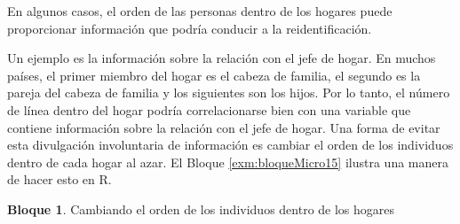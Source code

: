 \documentclass[]{book}
\newenvironment{Shaded}{\begin{snugshade}}{\end{snugshade}}
\newcommand{\CommentTok}[1]{\textcolor[rgb]{0.56,0.35,0.01}{\textit{#1}}}
\newcommand{\DecValTok}[1]{\textcolor[rgb]{0.00,0.00,0.81}{#1}}
\newcommand{\KeywordTok}[1]{\textcolor[rgb]{0.13,0.29,0.53}{\textbf{#1}}}
\newcommand{\NormalTok}[1]{#1}
\newcommand{\OperatorTok}[1]{\textcolor[rgb]{0.81,0.36,0.00}{\textbf{#1}}}
\newcommand{\StringTok}[1]{\textcolor[rgb]{0.31,0.60,0.02}{#1}}
\theoremstyle{definition}
\theoremstyle{definition}
\newtheorem{example}{Bloque}[chapter]
\theoremstyle{definition}
\theoremstyle{definition}
\theoremstyle{remark}
\begin{document}
\begin{Shaded}
\end{Shaded}

En algunos casos, el orden de las personas dentro de los hogares puede proporcionar información que podría conducir a la reidentificación.

Un ejemplo es la información sobre la relación con el jefe de hogar. En muchos países, el primer miembro del hogar es el cabeza de familia, el segundo es la pareja del cabeza de familia y los siguientes son los hijos. Por lo tanto, el número de línea dentro del hogar podría correlacionarse bien con una variable que contiene información sobre la relación con el jefe de hogar. Una forma de evitar esta divulgación involuntaria de información es cambiar el orden de los individuos dentro de cada hogar al azar. El Bloque \ref{exm:bloqueMicro15} ilustra una manera de hacer esto en R.

\begin{example}
\protect\hypertarget{exm:bloqueMicro15}{}{\label{exm:bloqueMicro15} }Cambiando el orden de los individuos dentro de los hogares
\end{example}
\end{document}
